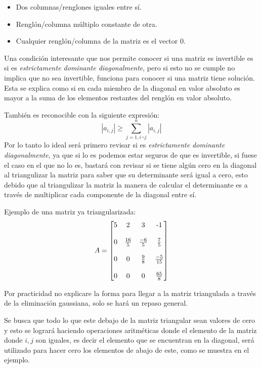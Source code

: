 \documentclass{article}
\begin{document}
\begin{itemize}
  \item Dos columnas/renglones iguales entre sí.
  \item Renglón/columna múltiplo constante de otra.
  \item Cualquier renglón/columna de la matriz es el vector 0.
\end{itemize}


Una condición interesante que nos permite conocer si una matriz es invertible
es si es \emph{estrictamente dominante diagonalmente}, pero si esto no se cumple
no implica que no sea invertible, funciona para conocer si una matriz tiene solución.
Esta se explica como si en cada miembro de la diagonal en valor absoluto es
mayor a la suma de los elementos restantes del renglón en valor absoluto.


También es reconocible con la siguiente expresión:
\begin{equation*}
  |a_{i,j}| \geq \sum_{j=1, i \neg j}^{n}|a_{i,j}|
\end{equation*}
Por lo tanto lo ideal será primero revisar si es \emph{estrictamente dominante diagonalmente},
ya que si lo es podemos estar seguros de que es invertible, si fuese el caso en el
que no lo es, bastará con revisar si se tiene algún cero en la diagonal al triangulizar la
matriz para saber que su determinante será igual a cero, esto debido que al triangulizar la
matriz la manera de calcular el determinante es a través de multiplicar cada componente de la
diagonal entre sí.


Ejemplo de una matriz ya triangularizada:
\begin{equation*}
 A = \begin{bmatrix}
    5 & 2 & 3 & $-1$ \\
      & & & \\
    0 & \frac{16}{5} & \frac{-6}{5} & \frac{7}{5} \\
    & & & \\
    0 & 0 & \frac{9}{8} & \frac{-5}{15} \\
    & & & \\
    0 & 0 & 0 & \frac{65}{8} \\
 \end{bmatrix}
\end{equation*}


Por practicidad no explicare la forma para llegar a la matriz triangulada a través de la
eliminación gaussiana, solo se hará un repaso general.


Se busca que todo lo que este debajo de la matriz triangular sean valores de cero y esto
se logrará haciendo operaciones aritméticas donde el elemento de la matriz donde $i,j$ son
iguales, es decir el elemento que se encuentran en la diagonal, será utilizado para hacer cero
los elementos de abajo de este, como se muestra en el ejemplo.
\end{document}
